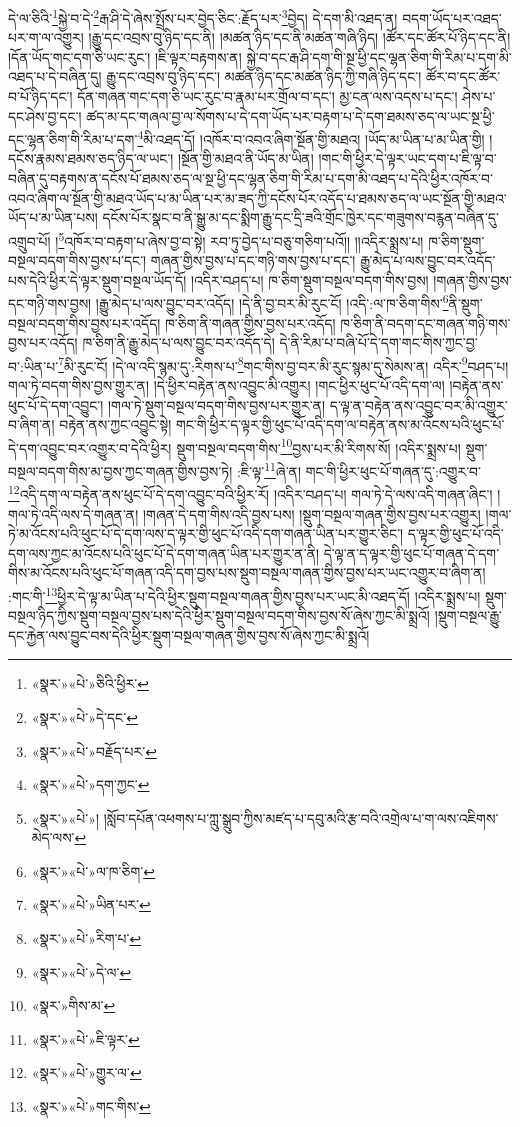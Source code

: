 དེ་ལ་ཅིའི་\footnote{«སྣར་»«པེ་»ཅིའི་ཕྱིར་}སྐྱེ་བ་དེ་\footnote{«སྣར་»«པེ་»དེ་དང་}རྒ་ཤི་དེ་ཞེས་སྤྲོས་པར་བྱེད་ཅིང་:རྗོད་པར་\footnote{«སྣར་»«པེ་»བརྗོད་པར་}བྱེད། དེ་དག་མི་འཐད་ན། བདག་ཡོད་པར་འཐད་པར་ག་ལ་འགྱུར། །རྒྱུ་དང་འབྲས་བུ་ཉིད་དང་ནི། །མཚན་ཉིད་དང་ནི་མཚན་གཞི་ཉིད། །ཚོར་དང་ཚོར་པོ་ཉིད་དང་ནི། །དོན་ཡོད་གང་དག་ཅི་ཡང་རུང་། །ཇི་ལྟར་བརྟགས་ན། སྐྱེ་བ་དང་རྒ་ཤི་དག་གི་སྔ་ཕྱི་དང་ལྷན་ཅིག་གི་རིམ་པ་དག་མི་འཐད་པ་དེ་བཞིན་དུ། རྒྱུ་དང་འབྲས་བུ་ཉིད་དང་། མཚན་ཉིད་དང་མཚན་ཉིད་ཀྱི་གཞི་ཉིད་དང་། ཚོར་བ་དང་ཚོར་བ་པོ་ཉིད་དང་། དོན་གཞན་གང་དག་ཅི་ཡང་རུང་བ་རྣམ་པར་གྲོལ་བ་དང་། མྱ་ངན་ལས་འདས་པ་དང་། ཤེས་པ་དང་ཤེས་བྱ་དང་། ཚད་མ་དང་གཞལ་བྱ་ལ་སོགས་པ་དེ་དག་ཡོད་པར་བརྟག་པ་དེ་དག་ཐམས་ཅད་ལ་ཡང་སྔ་ཕྱི་དང་ལྷན་ཅིག་གི་རིམ་པ་དག་\footnote{«སྣར་»«པེ་»དག་ཀྱང་}མི་འཐད་དོ། །འཁོར་བ་འབའ་ཞིག་སྔོན་གྱི་མཐའ། །ཡོད་མ་ཡིན་པ་མ་ཡིན་གྱི། །
དངོས་རྣམས་ཐམས་ཅད་ཉིད་ལ་ཡང་། །སྔོན་གྱི་མཐའ་ནི་ཡོད་མ་ཡིན། །གང་གི་ཕྱིར་དེ་ལྟར་ཡང་དག་པ་ཇི་ལྟ་བ་བཞིན་དུ་བརྟགས་ན་དངོས་པོ་ཐམས་ཅད་ལ་སྔ་ཕྱི་དང་ལྷན་ཅིག་གི་རིམ་པ་དག་མི་འཐད་པ་དེའི་ཕྱིར་འཁོར་བ་འབའ་ཞིག་ལ་སྔོན་གྱི་མཐའ་ཡོད་པ་མ་ཡིན་པར་མ་ཟད་ཀྱི་དངོས་པོར་འདོད་པ་ཐམས་ཅད་ལ་ཡང་སྔོན་གྱི་མཐའ་ཡོད་པ་མ་ཡིན་པས། དངོས་པོར་སྣང་བ་ནི་སྒྱུ་མ་དང་སྨིག་རྒྱུ་དང་དྲི་ཟའི་གྲོང་ཁྱེར་དང་གཟུགས་བརྙན་བཞིན་དུ་འགྲུབ་པོ། །\footnote{«སྣར་»«པེ་»། །སློབ་དཔོན་འཕགས་པ་ཀླུ་སྒྲུབ་ཀྱིས་མཛད་པ་དབུ་མའི་རྩ་བའི་འགྲེལ་པ་ག་ལས་འཇིགས་མེད་ལས་}འཁོར་བ་བརྟག་པ་ཞེས་བྱ་བ་སྟེ། རབ་ཏུ་བྱེད་པ་བཅུ་གཅིག་པའོ།། །།འདིར་སྨྲས་པ། ཁ་ཅིག་སྡུག་བསྔལ་བདག་གིས་བྱས་པ་དང་། གཞན་གྱིས་བྱས་པ་དང་གཉི་གས་བྱས་པ་དང་། རྒྱུ་མེད་པ་ལས་བྱུང་བར་འདོད་པས་དེའི་ཕྱིར་དེ་ལྟར་སྡུག་བསྔལ་ཡོད་དོ། །འདིར་བཤད་པ། ཁ་ཅིག་སྡུག་བསྔལ་བདག་གིས་བྱས། །གཞན་གྱིས་བྱས་དང་གཉི་གས་བྱས། །རྒྱུ་མེད་པ་ལས་བྱུང་བར་འདོད། །དེ་ནི་བྱ་བར་མི་རུང་ངོ། །འདི་:ལ་ཁ་ཅིག་གིས་\footnote{«སྣར་»«པེ་»ལ་ཁ་ཅིག་}ནི་སྡུག་བསྔལ་བདག་གིས་བྱས་པར་འདོད། ཁ་ཅིག་ནི་གཞན་གྱིས་བྱས་པར་འདོད། ཁ་ཅིག་ནི་བདག་དང་གཞན་གཉི་གས་བྱས་པར་འདོད། ཁ་ཅིག་ནི་རྒྱུ་མེད་པ་ལས་བྱུང་བར་འདོད་དེ། དེ་ནི་རིམ་པ་བཞི་པོ་དེ་དག་གང་གིས་ཀྱང་བྱ་བ་:ཡིན་པ་\footnote{«སྣར་»«པེ་»ཡིན་པར་}མི་རུང་ངོ། །དེ་ལ་འདི་སྙམ་དུ་:རིགས་པ་\footnote{«སྣར་»«པེ་»རིག་པ་}གང་གིས་བྱ་བར་མི་རུང་སྙམ་དུ་སེམས་ན། འདིར་\footnote{«སྣར་»«པེ་»དེ་ལ་}བཤད་པ། གལ་ཏེ་བདག་གིས་བྱས་གྱུར་ན། །དེ་ཕྱིར་བརྟེན་ནས་འབྱུང་མི་འགྱུར། །གང་ཕྱིར་ཕུང་པོ་འདི་དག་ལ། །བརྟེན་ནས་ཕུང་པོ་དེ་དག་འབྱུང་། །གལ་ཏེ་སྡུག་བསྔལ་བདག་གིས་བྱས་པར་གྱུར་ན། ད་ལྟ་ན་བརྟེན་ནས་འབྱུང་བར་མི་འགྱུར་བ་ཞིག་ན། བརྟེན་ནས་ཀྱང་འབྱུང་སྟེ། གང་གི་ཕྱིར་ད་ལྟར་གྱི་ཕུང་པོ་འདི་དག་ལ་བརྟེན་ནས་མ་འོངས་པའི་ཕུང་པོ་དེ་དག་འབྱུང་བར་འགྱུར་བ་དེའི་ཕྱིར། སྡུག་བསྔལ་བདག་གིས་\footnote{«སྣར་»གིས་མ་}བྱས་པར་མི་རིགས་སོ། །འདིར་སྨྲས་པ། སྡུག་བསྔལ་བདག་གིས་མ་བྱས་ཀྱང་གཞན་གྱིས་བྱས་ཏེ། :ཇི་ལྟ་\footnote{«སྣར་»«པེ་»ཇི་ལྟར་}ཞེ་ན། གང་གི་ཕྱིར་ཕུང་པོ་གཞན་དུ་:འགྱུར་བ་\footnote{«སྣར་»«པེ་»གྱུར་ལ་}འདི་དག་ལ་བརྟེན་ནས་ཕུང་པོ་དེ་དག་འབྱུང་བའི་ཕྱིར་རོ། །འདིར་བཤད་པ། གལ་ཏེ་དེ་ལས་འདི་གཞན་ཞིང་། །གལ་ཏེ་འདི་ལས་དེ་གཞན་ན། །གཞན་དེ་དག་གིས་འདི་བྱས་པས། །སྡུག་བསྔལ་གཞན་གྱིས་བྱས་པར་འགྱུར། །གལ་ཏེ་མ་འོངས་པའི་ཕུང་པོ་དེ་དག་ལས་ད་ལྟར་གྱི་ཕུང་པོ་འདི་དག་གཞན་ཡིན་པར་གྱུར་ཅིང་། ད་ལྟར་གྱི་ཕུང་པོ་འདི་དག་ལས་ཀྱང་མ་འོངས་པའི་ཕུང་པོ་དེ་དག་གཞན་ཡིན་པར་གྱུར་ན་ནི། དེ་ལྟ་ན་ད་ལྟར་གྱི་ཕུང་པོ་གཞན་དེ་དག་གིས་མ་འོངས་པའི་ཕུང་པོ་གཞན་འདི་དག་བྱས་པས་སྡུག་བསྔལ་གཞན་གྱིས་བྱས་པར་ཡང་འགྱུར་བ་ཞིག་ན། :གང་གི་\footnote{«སྣར་»«པེ་»གང་གིས་}ཕྱིར་དེ་ལྟ་མ་ཡིན་པ་དེའི་ཕྱིར་སྡུག་བསྔལ་གཞན་གྱིས་བྱས་པར་ཡང་མི་འཐད་དོ། །འདིར་སྨྲས་པ། སྡུག་བསྔལ་ཉིད་ཀྱིས་སྡུག་བསྔལ་བྱས་པས་དེའི་ཕྱིར་སྡུག་བསྔལ་བདག་གིས་བྱས་སོ་ཞེས་ཀྱང་མི་སྨྲའོ། །སྡུག་བསྔལ་རྒྱུ་དང་རྐྱེན་ལས་བྱུང་བས་དེའི་ཕྱིར་སྡུག་བསྔལ་གཞན་གྱིས་བྱས་སོ་ཞེས་ཀྱང་མི་སྨྲའོ། 